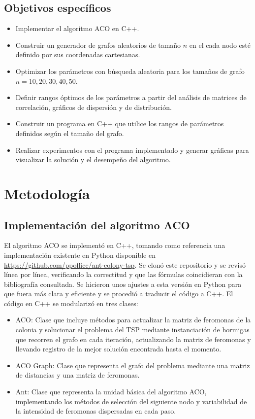 \documentclass[conference]{IEEEtran}
\begin{document}
\subsection{Objetivos específicos}
\begin{itemize}
\item Implementar el algoritmo ACO en C++.
\item Construir un generador de grafos aleatorios de tamaño $n$ en el cada nodo esté definido por sus coordenadas cartesianas.
\item Optimizar los parámetros con búsqueda aleatoria para los tamaños de grafo $n=10, 20, 30, 40, 50$.
\item Definir rangos óptimos de los parámetros a partir del análisis de matrices de correlación, gráficos de dispersión y de distribución.
\item Construir un programa en C++ que utilice los rangos de parámetros definidos según el tamaño del grafo.
\item Realizar experimentos con el programa implementado y generar gráficas para visualizar la solución y el desempeño del algoritmo.
\end{itemize}
\section {Metodología}
\subsection{Implementación del algoritmo ACO}
El algoritmo ACO se implementó en C++, tomando como referencia una implementación existente en Python disponible en \url{https://github.com/ppoffice/ant-colony-tsp}. Se clonó este repositorio y se revisó línea por línea, verificando la correctitud y que las fórmulas coincidieran con la bibliografía consultada. Se hicieron unos ajustes a esta versión en Python para que fuera más clara y eficiente y se procedió a traducir el código a C++.
El código en C++ se modularizó en tres clases:
\begin{itemize}
\item ACO: Clase que incluye métodos para actualizar la matriz de feromonas de la colonia y solucionar el problema del TSP mediante instanciación de hormigas que recorren el grafo en cada iteración, actualizando la matriz de feromonas y llevando registro de la mejor solución encontrada hasta el momento.
\item ACO Graph: Clase que representa el grafo del problema mediante una matriz de distancias y una matriz de feromonas.
\item Ant: Clase que representa la unidad básica del algoritmo ACO, implementando los métodos de selección del siguiente nodo y variabilidad de la intensidad de feromonas dispersadas en cada paso.
\end{itemize}
\end{document}
